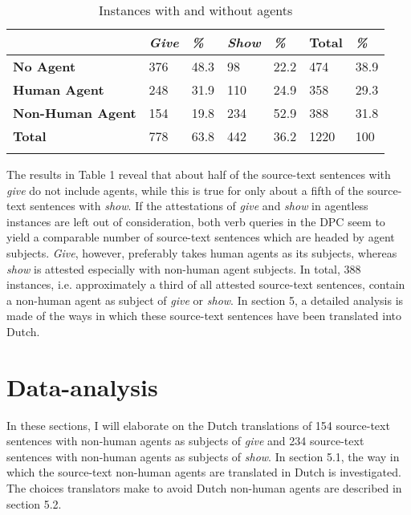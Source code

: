 \documentclass[output=paper]{LSP/langsci}
\begin{document}
\begin{table}
     \centering
     \begin{tabularx}{\textwidth}{XXXXXXX}
     \lsptoprule
                  &  \textit{Give}   & \textit{\%}  & \textit{Show}  & \textit{\%} & Total & \textit{\%} \\ \midrule
       \textbf{No Agent}    & 376    & 48.3          & 98	           & 22.2      & 474   & 38.9 \\
       \textbf{Human Agent} & 248    & 31.9          & 110             & 24.9      & 358   & 29.3  \\
       \textbf{Non-Human Agent} & 154 & 19.8         & 234             & 52.9      & 388   & 31.8 \\  \midrule
       \textbf{Total}       & 778     & 63.8        & 442              & 36.2      & 1220  & 100  \\ 
  \lspbottomrule     
     \end{tabularx}
 
     \caption{Instances with and without agents}
     \label{5.1}
 
   \end{table}

The results in Table 1 reveal that about half of the source-text sentences with \textit{give} do not include agents, while this is true for only about a fifth of the source-text sentences with \textit{show}. If the attestations of \textit{give} and \textit{show} in agentless instances are left out of consideration, both verb queries in the DPC seem to yield a comparable number of source-text sentences which are headed by agent subjects. \textit{Give}, however, preferably takes human agents as its subjects, whereas \textit{show} is attested especially with non-human agent subjects. In total, 388 instances, i.e. approximately a third of all attested source-text sentences, contain a non-human agent as subject of \textit{give} or \textit{show}. In section 5, a detailed analysis is made of the ways in which these source-text sentences have been translated into Dutch. 

\section{Data-analysis}

In these sections, I will elaborate on the Dutch translations of 154 source-text sentences with non-human agents as subjects of \textit{give} and 234 source-text sentences with non-human agents as subjects of \textit{show}. In section 5.1, the way in which the source-text non-human agents are translated in Dutch is investigated. The choices translators make to avoid Dutch non-human agents are described in section 5.2.
  
\end{document}

